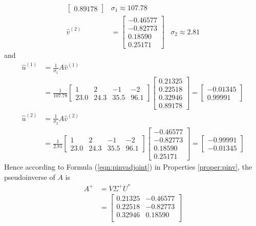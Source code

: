 \begin{solution}
\begin{align*}
\begin{bmatrix}
0.89178
\end{bmatrix}
& \sigma_1 \approx 107.78 \\
\hat{v}^{(2)} &= 
\begin{bmatrix}
-0.46577 \\
-0.82773 \\
0.18590 \\
0.25171
\end{bmatrix}
& \sigma_2 \approx 2.81 
\end{align*}
and
\begin{align*}
\hat{u}^{(1)} &= \frac{1}{\sigma_1} A\hat{v}^{(1)} \\
&= \frac{1}{107.78} \begin{bmatrix}
1 & 2 & -1 & -2 \\
23.0 & 24.3 & 35.5 & 96.1    
\end{bmatrix}
\begin{bmatrix}
0.21325 \\
0.22518 \\  
0.32946 \\
0.89178
\end{bmatrix} = 
\begin{bmatrix}
-0.01345 \\
0.99991
\end{bmatrix} \\
\hat{u}^{(2)} &= \frac{1}{\sigma_2} A\hat{v}^{(2)} \\
&= \frac{1}{2.81} \begin{bmatrix}
1 & 2 & -1 & -2 \\
23.0 & 24.3 & 35.5 & 96.1    
\end{bmatrix}
\begin{bmatrix}
-0.46577 \\
-0.82773 \\
0.18590 \\
0.25171
\end{bmatrix} = 
\begin{bmatrix}
-0.99991 \\
-0.01345
\end{bmatrix}
\end{align*}
Hence according to Formula (\ref{eqn:pinvadjoint}) in Properties \ref{proper:pinv}, the pseudoinverse of $A$ is
\begin{align*}
A^+ &= V\Sigma^+ U^* \\
&= 
\begin{bmatrix}
0.21325 & -0.46577 \\
0.22518 & -0.82773 \\  
0.32946 & 0.18590 \\

\end{bmatrix}
\end{align*}
\end{solution}

